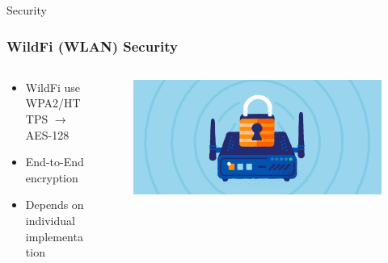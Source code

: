 \documentclass{beamer}
\begin{document}
  \begin{frame}{Security}
    \frametitle{WildFi (WLAN) Security}
    \begin{columns}
      \begin{column}{0.5\textwidth}
        \begin{itemize}
          \item WildFi use WPA2/HTTPS $\rightarrow$ AES-128
          \item End-to-End encryption
          \item Depends on individual implementation
        \end{itemize}
      \end{column}
      \begin{column}{0.5\textwidth}
        \begin{figure}[htbp]
          \centering
          \includegraphics[width=\textwidth]{wireless-router-security.png}
          \label{fig:Wifi_security}
        \end{figure}
      \end{column}
    \end{columns}
  \end{frame}
\end{document}
